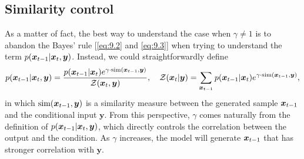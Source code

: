\subsection{Similarity control}

As a matter of fact, the best way to understand the case when $\gamma\neq 1$ is to abandon the Bayes' rule [\cref{eq:9.2} and \cref{eq:9.3}] when trying to understand the term $p(\bm{x}_{t-1}|\bm{x}_{t},\bm{y})$. Instead, we could straightforwardly define
\begin{equation}
    \label{eq:9.11}
    p(\bm{x}_{t-1}|\bm{x}_{t},\bm{y})=\frac{p(\bm{x}_{t-1}|\bm{x}_{t})e^{\gamma\cdot\mbox{\scriptsize{sim}}(\bm{x}_{t-1},\bm{y})}}{\mathcal{Z}(\bm{x}_{t},\bm{y})},\quad \mathcal{Z}(\bm{x}_{t}|\bm{y})=\sum_{\bm{x}_{t-1}}p(\bm{x}_{t-1}|\bm{x}_{t})e^{\gamma\cdot\mbox{\scriptsize{sim}}(\bm{x}_{t-1},\bm{y})},
\end{equation}
in which $\mbox{sim}(\bm{x}_{t-1},\bm{y})$ is a similarity measure between the generated sample $\bm{x}_{t-1}$ and the conditional input $\bm{y}$. From this perspective, $\gamma$ comes naturally from the definition of  $p(\bm{x}_{t-1}|\bm{x}_{t},\bm{y})$, which directly controls the correlation between the output and the condition. As $\gamma$ increases, the model will generate $\bm{x}_{t-1}$ that has stronger correlation with $\bm{y}$.

